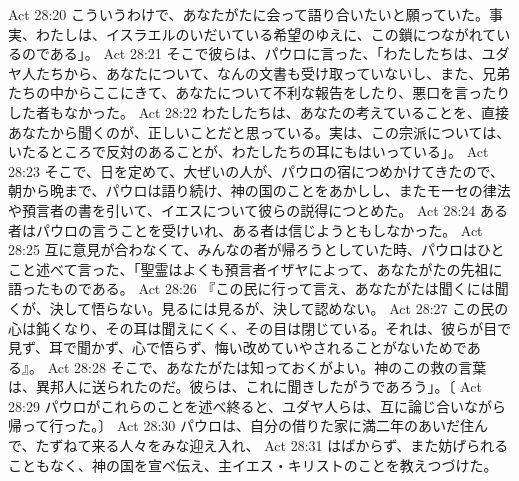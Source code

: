 Act 28:20  こういうわけで、あなたがたに会って語り合いたいと願っていた。事実、わたしは、イスラエルのいだいている希望のゆえに、この鎖につながれているのである」。
Act 28:21  そこで彼らは、パウロに言った、「わたしたちは、ユダヤ人たちから、あなたについて、なんの文書も受け取っていないし、また、兄弟たちの中からここにきて、あなたについて不利な報告をしたり、悪口を言ったりした者もなかった。
Act 28:22  わたしたちは、あなたの考えていることを、直接あなたから聞くのが、正しいことだと思っている。実は、この宗派については、いたるところで反対のあることが、わたしたちの耳にもはいっている」。
Act 28:23  そこで、日を定めて、大ぜいの人が、パウロの宿につめかけてきたので、朝から晩まで、パウロは語り続け、神の国のことをあかしし、またモーセの律法や預言者の書を引いて、イエスについて彼らの説得につとめた。
Act 28:24  ある者はパウロの言うことを受けいれ、ある者は信じようともしなかった。
Act 28:25  互に意見が合わなくて、みんなの者が帰ろうとしていた時、パウロはひとこと述べて言った、「聖霊はよくも預言者イザヤによって、あなたがたの先祖に語ったものである。
Act 28:26  『この民に行って言え、あなたがたは聞くには聞くが、決して悟らない。見るには見るが、決して認めない。
Act 28:27  この民の心は鈍くなり、その耳は聞えにくく、その目は閉じている。それは、彼らが目で見ず、耳で聞かず、心で悟らず、悔い改めていやされることがないためである』。
Act 28:28  そこで、あなたがたは知っておくがよい。神のこの救の言葉は、異邦人に送られたのだ。彼らは、これに聞きしたがうであろう」。〔
Act 28:29  パウロがこれらのことを述べ終ると、ユダヤ人らは、互に論じ合いながら帰って行った。〕
Act 28:30  パウロは、自分の借りた家に満二年のあいだ住んで、たずねて来る人々をみな迎え入れ、
Act 28:31  はばからず、また妨げられることもなく、神の国を宣べ伝え、主イエス・キリストのことを教えつづけた。


